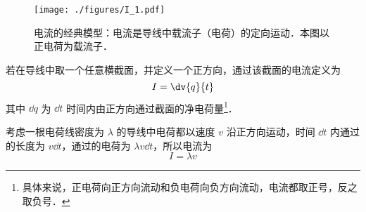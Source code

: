 
\begin{issues}
\issueDraft
\end{issues}

\begin{figure}[ht]
\centering
\texttt{[image: ./figures/I\_1.pdf]}
\caption{电流的经典模型：电流是导线中载流子（电荷）的定向运动．本图以正电荷为载流子．} \label{I_fig1}
\end{figure}

若在导线中取一个任意横截面，并定义一个正方向，通过该截面的电流定义为
\begin{equation}\label{I_eq1}
I = \dv{q}{t}
\end{equation}
其中 $\dd{q}$ 为 $\dd{t}$ 时间内由正方向通过截面的净电荷量\footnote{具体来说，正电荷向正方向流动和负电荷向负方向流动，电流都取正号，反之取负号．}．

考虑一根电荷线密度为 $\lambda$ 的导线中电荷都以速度 $v$ 沿正方向运动，时间 $\dd{t}$ 内通过的长度为 $v\dd{t}$，通过的电荷为 $\lambda v\dd{t}$，所以电流为
\begin{equation}
I = \lambda v
\end{equation}
